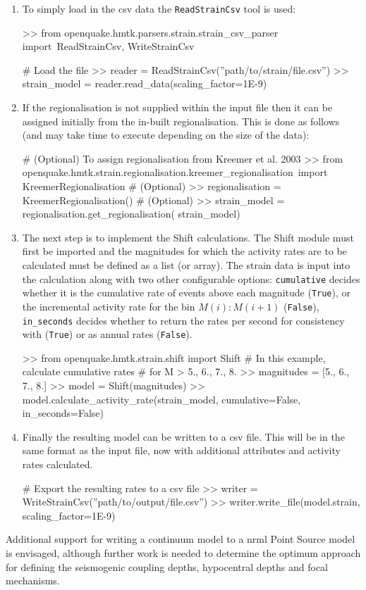 \begin{enumerate}

\item To simply load in the csv data the \verb=ReadStrainCsv= tool is used:

\begin{python}[frame=single]
>> from openquake.hmtk.parsers.strain.strain_csv_parser import\
    ReadStrainCsv, WriteStrainCsv

# Load the file
>> reader = ReadStrainCsv(''path/to/strain/file.csv'')
>> strain_model = reader.read_data(scaling_factor=1E-9)
\end{python}

\item If the regionalisation is not supplied within the input file then it can be assigned initially from the in-built \textcite{Kreemer_etal2003} regionalisation. This is done as follows (and may take time to execute depending on the size of the data):

\begin{python}[frame=single]
# (Optional) To assign regionalisation from Kreemer et al. 2003
>> from openquake.hmtk.strain.regionalisation.kreemer_regionalisation\
    import KreemerRegionalisation
# (Optional)
>> regionalisation = KreemerRegionalisation()
# (Optional)
>> strain_model = regionalisation.get_regionalisation(
    strain_model)
\end{python}

\item The next step is to implement the Shift calculations. The Shift module must first be imported and the magnitudes for which the activity rates are to be calculated must be defined as a list (or array). The strain data is input into the calculation along with two other configurable options: \verb=cumulative= decides whether it is the cumulative rate of events above each magnitude (\verb=True=), or the incremental activity rate for the bin $M \left( i \right):M \left( {i + 1} \right)$ (\verb=False=), \verb=in_seconds= decides whether to return the rates per second for consistency with \textcite{Bird_etal2010} (\verb=True=) or as annual rates (\verb=False=). 

\begin{python}[frame=single]
>> from openquake.hmtk.strain.shift import Shift
# In this example, calculate cumulative rates 
# for M > 5., 6., 7., 8.
>> magnitudes = [5., 6., 7., 8.]
>> model = Shift(magnitudes)
>> model.calculate_activity_rate(strain_model,
                                 cumulative=False,
                                 in_seconds=False)
\end{python}

\item Finally the resulting model can be written to a csv file. This will be in the same format as the input file, now with additional attributes and activity rates calculated.

\begin{python}[frame=single]
# Export the resulting rates to a csv file
>> writer = WriteStrainCsv(''path/to/output/file.csv'')
>> writer.write_file(model.strain, scaling_factor=1E-9)
\end{python}
\end{enumerate}

Additional support for writing a continuum model to a nrml Point Source model is envisaged, although further work is needed to determine the optimum approach for defining the seismogenic coupling depths, hypocentral depths and focal mechanisms. 
